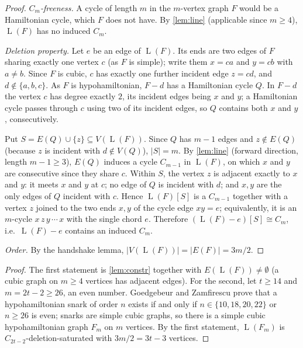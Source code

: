 \documentclass[11pt,a4paper]{article}
\theoremstyle{plain}
\theoremstyle{definition}
\theoremstyle{remark}
\newcommand{\Ln}{\operatorname{L}}
\begin{document}
\label{pf:constr}
\lemconstr*
\begin{proof}
\emph{$C_m$-freeness.} A cycle of length $m$ in the $m$-vertex graph $F$ would be a Hamiltonian cycle, which $F$ does not have. By \cref{lem:line} (applicable since $m\ge4$), $\Ln(F)$ has no induced $C_m$.

\emph{Deletion property.} Let $e$ be an edge of $\Ln(F)$. Its ends are two edges of $F$ sharing exactly one vertex $c$ (as $F$ is simple); write them $x=ca$ and $y=cb$ with $a\ne b$. Since $F$ is cubic, $c$ has exactly one further incident edge $z=cd$, and $d\notin\{a,b,c\}$. As $F$ is hypohamiltonian, $F-d$ has a Hamiltonian cycle $Q$. In $F-d$ the vertex $c$ has degree exactly $2$, its incident edges being $x$ and $y$; a Hamiltonian cycle passes through $c$ using two of its incident edges, so $Q$ contains both $x$ and $y$, consecutively.

Put $S=E(Q)\cup\{z\}\subseteq V(\Ln(F))$. Since $Q$ has $m-1$ edges and $z\notin E(Q)$ (because $z$ is incident with $d\notin V(Q)$), $|S|=m$. By \cref{lem:line} (forward direction, length $m-1\ge3$), $E(Q)$ induces a cycle $C_{m-1}$ in $\Ln(F)$, on which $x$ and $y$ are consecutive since they share $c$. Within $S$, the vertex $z$ is adjacent exactly to $x$ and $y$: it meets $x$ and $y$ at $c$; no edge of $Q$ is incident with $d$; and $x,y$ are the only edges of $Q$ incident with $c$. Hence $\Ln(F)[S]$ is a $C_{m-1}$ together with a vertex $z$ joined to the two ends $x,y$ of the cycle edge $xy=e$; equivalently, it is an $m$-cycle $x\,z\,y\,\cdots\,x$ with the single chord $e$. Therefore $(\Ln(F)-e)[S]\cong C_m$, i.e.\ $\Ln(F)-e$ contains an induced $C_m$.

\emph{Order.} By the handshake lemma, $|V(\Ln(F))|=|E(F)|=3m/2$.
\end{proof}

\label{pf:main}
\thmmain*
\begin{proof}
The first statement is \cref{lem:constr} together with $E(\Ln(F))\ne\emptyset$ (a cubic graph on $m\ge4$ vertices has adjacent edges). For the second, let $t\ge14$ and $m=2t-2\ge26$, an even number. Goedgebeur and Zamfirescu \cite[Theorem~3.6]{GZ18} prove that a hypohamiltonian snark of order $n$ exists if and only if $n\in\{10,18,20,22\}$ or $n\ge26$ is even; snarks are simple cubic graphs, so there is a simple cubic hypohamiltonian graph $F_m$ on $m$ vertices. By the first statement, $\Ln(F_m)$ is $C_{2t-2}$-deletion-saturated with $3m/2=3t-3$ vertices.
\end{proof}
\end{document}
